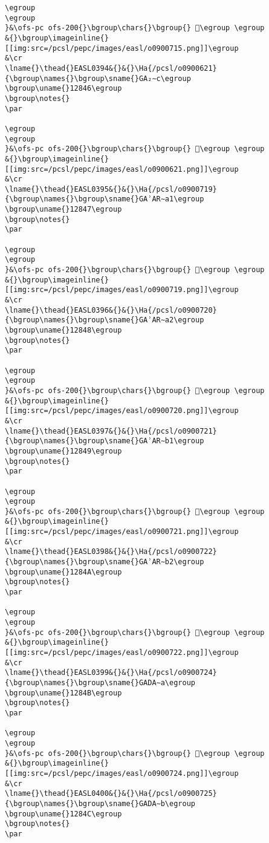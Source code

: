 \begin{verbatim}
\egroup
\egroup
}&\ofs-pc ofs-200{}\bgroup\chars{}\bgroup{} 𒡅\egroup \egroup
&{}\bgroup\imageinline{}[[img:src=/pcsl/pepc/images/easl/o0900715.png]]\egroup
&\cr
\lname{}\thead{}EASL0394&{}&{}\Ha{/pcsl/o0900621}{\bgroup\names{}\bgroup\sname{}GA₂∼c\egroup
\bgroup\uname{}12846\egroup
\bgroup\notes{}
\par 

\egroup
\egroup
}&\ofs-pc ofs-200{}\bgroup\chars{}\bgroup{} 𒡆\egroup \egroup
&{}\bgroup\imageinline{}[[img:src=/pcsl/pepc/images/easl/o0900621.png]]\egroup
&\cr
\lname{}\thead{}EASL0395&{}&{}\Ha{/pcsl/o0900719}{\bgroup\names{}\bgroup\sname{}GAʾAR∼a1\egroup
\bgroup\uname{}12847\egroup
\bgroup\notes{}
\par 

\egroup
\egroup
}&\ofs-pc ofs-200{}\bgroup\chars{}\bgroup{} 𒡇\egroup \egroup
&{}\bgroup\imageinline{}[[img:src=/pcsl/pepc/images/easl/o0900719.png]]\egroup
&\cr
\lname{}\thead{}EASL0396&{}&{}\Ha{/pcsl/o0900720}{\bgroup\names{}\bgroup\sname{}GAʾAR∼a2\egroup
\bgroup\uname{}12848\egroup
\bgroup\notes{}
\par 

\egroup
\egroup
}&\ofs-pc ofs-200{}\bgroup\chars{}\bgroup{} 𒡈\egroup \egroup
&{}\bgroup\imageinline{}[[img:src=/pcsl/pepc/images/easl/o0900720.png]]\egroup
&\cr
\lname{}\thead{}EASL0397&{}&{}\Ha{/pcsl/o0900721}{\bgroup\names{}\bgroup\sname{}GAʾAR∼b1\egroup
\bgroup\uname{}12849\egroup
\bgroup\notes{}
\par 

\egroup
\egroup
}&\ofs-pc ofs-200{}\bgroup\chars{}\bgroup{} 𒡉\egroup \egroup
&{}\bgroup\imageinline{}[[img:src=/pcsl/pepc/images/easl/o0900721.png]]\egroup
&\cr
\lname{}\thead{}EASL0398&{}&{}\Ha{/pcsl/o0900722}{\bgroup\names{}\bgroup\sname{}GAʾAR∼b2\egroup
\bgroup\uname{}1284A\egroup
\bgroup\notes{}
\par 

\egroup
\egroup
}&\ofs-pc ofs-200{}\bgroup\chars{}\bgroup{} 𒡊\egroup \egroup
&{}\bgroup\imageinline{}[[img:src=/pcsl/pepc/images/easl/o0900722.png]]\egroup
&\cr
\lname{}\thead{}EASL0399&{}&{}\Ha{/pcsl/o0900724}{\bgroup\names{}\bgroup\sname{}GADA∼a\egroup
\bgroup\uname{}1284B\egroup
\bgroup\notes{}
\par 

\egroup
\egroup
}&\ofs-pc ofs-200{}\bgroup\chars{}\bgroup{} 𒡋\egroup \egroup
&{}\bgroup\imageinline{}[[img:src=/pcsl/pepc/images/easl/o0900724.png]]\egroup
&\cr
\lname{}\thead{}EASL0400&{}&{}\Ha{/pcsl/o0900725}{\bgroup\names{}\bgroup\sname{}GADA∼b\egroup
\bgroup\uname{}1284C\egroup
\bgroup\notes{}
\par 


\end{verbatim}
